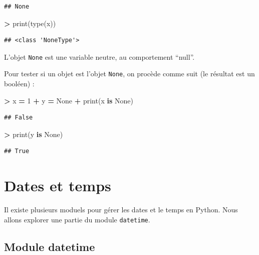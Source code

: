 \documentclass[12pt,]{book}
\newenvironment{Shaded}{\begin{snugshade}}{\end{snugshade}}
\newcommand{\KeywordTok}[1]{\textcolor[rgb]{0.13,0.29,0.53}{\textbf{#1}}}
\newcommand{\DecValTok}[1]{\textcolor[rgb]{0.00,0.00,0.81}{#1}}
\newcommand{\VariableTok}[1]{\textcolor[rgb]{0.00,0.00,0.00}{#1}}
\newcommand{\OperatorTok}[1]{\textcolor[rgb]{0.81,0.36,0.00}{\textbf{#1}}}
\newcommand{\BuiltInTok}[1]{#1}
\newcommand{\NormalTok}[1]{#1}
\numberwithin{equation}{section}
\numberwithin{countremarque}{section}
\begin{document}
\begin{lstlisting}
## None
\end{lstlisting}

\begin{Shaded}
\begin{Highlighting}[]
\OperatorTok{>} \BuiltInTok{print}\NormalTok{(}\BuiltInTok{type}\NormalTok{(x))}
\end{Highlighting}
\end{Shaded}

\begin{lstlisting}
## <class 'NoneType'>
\end{lstlisting}

L'objet \texttt{None} est une variable neutre, au comportement ``null''.

Pour tester si un objet est l'objet \texttt{None}, on procède comme suit
(le résultat est un booléen) :

\begin{Shaded}
\begin{Highlighting}[]
\OperatorTok{>}\NormalTok{ x }\OperatorTok{=} \DecValTok{1}
\OperatorTok{+}\NormalTok{ y }\OperatorTok{=} \VariableTok{None}
\OperatorTok{+} \BuiltInTok{print}\NormalTok{(x }\KeywordTok{is} \VariableTok{None}\NormalTok{)}
\end{Highlighting}
\end{Shaded}

\begin{lstlisting}
## False
\end{lstlisting}

\begin{Shaded}
\begin{Highlighting}[]
\OperatorTok{>} \BuiltInTok{print}\NormalTok{(y }\KeywordTok{is} \VariableTok{None}\NormalTok{)}
\end{Highlighting}
\end{Shaded}

\begin{lstlisting}
## True
\end{lstlisting}

\section{Dates et temps}\label{dates-et-temps}

Il existe plusieurs moduels pour gérer les dates et le temps en Python.
Nous allons explorer une partie du module \texttt{datetime}.

\subsection{Module datetime}\label{module-datetime}
\end{document}
